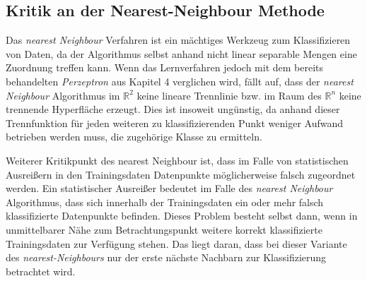 \documentclass[fontsize=11pt]{scrartcl}
\begin{document}
            \subsection{Kritik an der      Nearest-Neighbour Methode}
                Das \emph{nearest Neighbour} Verfahren ist ein mächtiges Werkzeug zum Klassifizieren von Daten, da der Algorithmus selbst anhand nicht linear separable Mengen eine Zuordnung treffen kann.\cite{ertel2016} Wenn das Lernverfahren jedoch mit dem bereits behandelten \emph{Perzeptron} aus Kapitel 4 verglichen wird, fällt auf, dass der \emph{nearest Neighbour} Algorithmus im $\mathbb{R}^2$ keine lineare Trennlinie bzw. im Raum des $\mathbb{R}^n$ keine trennende Hyperfläche erzeugt. Dies ist insoweit ungünstig, da anhand dieser Trennfunktion für jeden weiteren zu klassifizierenden Punkt weniger Aufwand betrieben werden muss, die zugehörige Klasse zu ermitteln.\cite{ertel2016}\par
                Weiterer Kritikpunkt des nearest Neighbour ist, dass im Falle von statistischen Ausreißern in den Trainingsdaten Datenpunkte möglicherweise falsch zugeordnet werden. Ein statistischer Ausreißer bedeutet im Falle des \emph{nearest Neighbour} Algorithmus, dass sich innerhalb der Trainingsdaten ein oder mehr falsch klassifizierte Datenpunkte befinden. Dieses Problem besteht selbst dann, wenn in unmittelbarer Nähe zum Betrachtungspunkt weitere korrekt klassifizierte Trainingsdaten zur Verfügung stehen. Das liegt daran, dass bei dieser Variante des \emph{nearest-Neighbours} nur der erste nächste Nachbarn zur Klassifizierung betrachtet wird.\cite{ertel2016}\par
\end{document}
